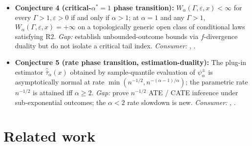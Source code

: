 \documentclass[11pt]{article}
\theoremstyle{definition}
\theoremstyle{plain}
\theoremstyle{remark}
\begin{document}
\begin{itemize}[leftmargin=2em]
  \item \textbf{Conjecture 4 (critical-$\alpha^* = 1$ phase transition):} $W_\alpha(\Gamma,\varepsilon,x) < \infty$ for every $\Gamma > 1, \varepsilon > 0$ if and only if $\alpha > 1$; at $\alpha = 1$ and any $\Gamma > 1$, $W_\alpha(\Gamma,\varepsilon,x) = +\infty$ on a topologically generic open class of conditional laws satisfying R2. \emph{Gap:} \citet{JungKang2026ITBounds} establish unbounded-outcome bounds via $f$-divergence duality but do not isolate a critical tail index. \emph{Consumer:} \citet{JungKang2026ITBounds}, \citet{LordanSalehzadehNobari2026TailUncertainty}.
  \item \textbf{Conjecture 5 (rate phase transition, estimation-duality):} The plug-in estimator $\widehat{\overline{\tau}}_\alpha(x)$ obtained by sample-quantile evaluation of $\psi^\pm_\alpha$ is asymptotically normal at rate $\min(n^{-1/2}, n^{-(\alpha-1)/\alpha})$; the parametric rate $n^{-1/2}$ is attained iff $\alpha \ge 2$. \emph{Gap:} \citet{YadlowskyNamkoongBasuDuchiTian2022} prove $n^{-1/2}$ ATE / CATE inference under sub-exponential outcomes; the $\alpha < 2$ rate slowdown is new. \emph{Consumer:} \citet{TudballBowdenHughesTilling2023SampleConstrained}, \citet{DornGuoKallus2025}.
\end{itemize}

\section{Related work}
\end{document}
